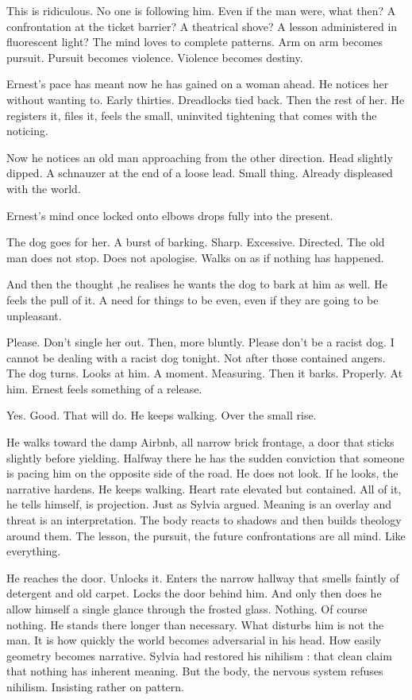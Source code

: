 This is ridiculous. No one is following him. Even if the man were, what then? A confrontation at the ticket barrier? A theatrical shove? A lesson administered in fluorescent light? The mind loves to complete patterns. Arm on arm becomes pursuit. Pursuit becomes violence. Violence becomes destiny.

Ernest's pace has meant now he has gained on a woman ahead. He notices her without wanting to. Early thirties. Dreadlocks tied back. Then the rest of her. He registers it, files it, feels the small, uninvited tightening that comes with the noticing.

Now he notices an old man approaching from the other direction. Head slightly dipped. A schnauzer at the end of a loose lead. Small thing.  Already displeased with the world.

Ernest’s mind once locked onto elbows drops fully into the present.

The dog goes for her. A burst of barking. Sharp. Excessive. Directed. The old man does not stop. Does not apologise. Walks on as if nothing has happened.

And then the thought ,he realises he wants the dog to bark at him as well. He feels the pull of it. A need for things to be even, even if they are going to be unpleasant.

Please. Don’t single her out. Then, more bluntly. Please don’t be a racist dog. I cannot be dealing with a racist dog tonight. Not after those contained angers. The dog turns. Looks at him.
A moment. Measuring. Then it barks. Properly. At him. Ernest feels something of a release.

Yes. Good. That will do. He keeps walking. Over the small rise.

He walks toward the damp Airbnb, all narrow brick frontage, a door that sticks slightly before yielding. Halfway there he has the sudden conviction that someone is pacing him on the opposite side of the road. He does not look. If he looks, the narrative hardens. He keeps walking. Heart rate elevated but contained. All of it, he tells himself, is projection. Just as Sylvia argued. Meaning is an overlay and threat is an interpretation. The body reacts to shadows and then builds theology around them. The lesson, the pursuit, the future confrontations are all mind. Like everything.

He reaches the door. Unlocks it. Enters the narrow hallway that smells faintly of detergent and old carpet. Locks the door behind him. And only then does he allow himself a single glance through the frosted glass. Nothing. Of course nothing. He stands there longer than necessary. What disturbs him is not the man. It is how quickly the world becomes adversarial in his head. How easily geometry becomes narrative. Sylvia had restored his nihilism : that clean claim that nothing has inherent meaning. But the body, the nervous system refuses nihilism. Insisting rather on pattern. 

